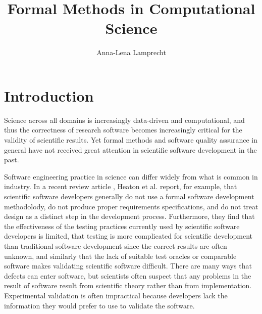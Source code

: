 \documentclass[sigplan,10pt,noacm]{acmart}
\begin{document}
\title{Formal Methods in Computational Science}
\author{Anna-Lena Lamprecht}

\maketitle


\section{Introduction}


Science across all domains is increasingly data-driven and computational, and thus the correctness of research software becomes increasingly critical for the validity of scientific results. Yet formal methods and software quality assurance in general have not received great attention in scientific software development in the past.

Software engineering practice in science can differ widely from what is common in industry. In a recent review article \cite{HeaCar2015}, Heaton et al. report, for example, that scientific software developers generally do not use a formal software development methodolody, do not produce proper requirements specifications, and do not treat design as a distinct step in the development process. Furthermore, they find that the effectiveness of the testing practices currently used by scientific software developers is limited, that testing is more complicated for scientific development than traditional software development since the correct results are often unknown, and similarly that the lack of suitable test oracles or comparable software makes validating scientific software difficult. There are many ways that defects can enter software, but scientists often suspect that any problems in the result of software result from scientific theory rather than from implementation. Experimental validation is often impractical because developers lack the information they would prefer to use to validate the software. 
\end{document}
